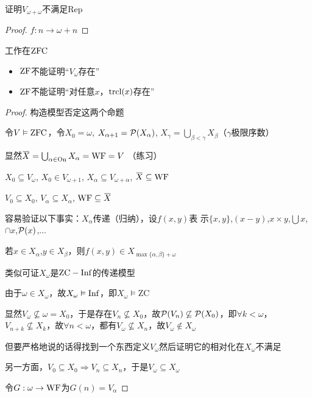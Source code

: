 \documentclass[11pt]{article}
\def \ZC {\text{ZC}}
\begin{document}
\begin{exercise}
证明\(V_{\omega+\omega}\)不满足Rep
\end{exercise}

\begin{proof}
\(f:n\to\omega+n\)
\end{proof}

\begin{proposition}[]
\label{7.8.3}
工作在\(\operatorname{ZFC}\)
\begin{itemize}
\item \(\operatorname{ZF}\)不能证明“\(V_\omega\)存在”
\item \(\operatorname{ZF}\)不能证明“对任意\(x\)，\(\operatorname{\text{trcl}}(x)\)存在”
\end{itemize}
\end{proposition}

\begin{proof}
构造模型否定这两个命题

令\(V\vDash\operatorname{ZFC}\)，令\(X_0=\omega\), \(X_{\alpha+1}=\mathcal{P}(X_\alpha)\), \(X_\gamma=\bigcup_{\beta<\gamma}X_\beta\)（\(\gamma\)极限序数）

显然\(\barX=\bigcup_{\alpha\in\On}X_\alpha=\WF=V\) （练习）

\(X_0\subseteq V_\omega\), \(X_0\in V_{\omega+1}\), \(X_\alpha\subseteq V_{\omega+\alpha}\), \(\barX\subseteq\WF\)

\(V_0\subseteq X_0\), \(V_\alpha\subseteq X_\alpha\), \(\WF\subseteq\barX\)

容易验证以下事实：\(X_\alpha\)传递（归纳），设\(f(x,y)\)表
示\(\{x,y\}\),\((x-y)\),\(x\times y\),\(\bigcup x\),\(\cap x\),\(\mathcal{P}(x)\),\(\dots\)

若\(x\in X_\alpha\),\(y\in X_\beta\)，则\(f(x,y)\in X_{\max\{\alpha,\beta\}+\omega}\)

类似可证\(X_\omega\)是\(\ZC-\Inf\)的传递模型

由于\(\omega\in X_\omega\)，故\(X_\omega\vDash\operatorname{Inf}\)，即\(X_\omega\vDash\ZC\)

显然\(V_\omega\not\subseteq\omega=X_0\)，于是存在\(V_n\not\subseteq X_0\)，故\(\mathcal{P}(V_n)\not\subseteq\mathcal{P}(X_0)\)，即\(\forall k<\omega\)，
\(V_{n+k}\not\subseteq X_k\)，故\(\forall n<\omega\)，都有\(V_\omega\not\subseteq X_n\)，故\(V_\omega\notin X_\omega\)

但要严格地说的话得找到一个东西定义\(V_\omega\)然后证明它的相对化在\(X_\omega\)不满足

另一方面，\(V_0\subseteq X_0\Rightarrow V_n\subseteq X_n\)，于是\(V_\omega\subseteq X_\omega\)

令\(G:\omega\to\operatorname{WF}\)为\(G(n)=V_\alpha\)


\end{proof}
\end{document}
